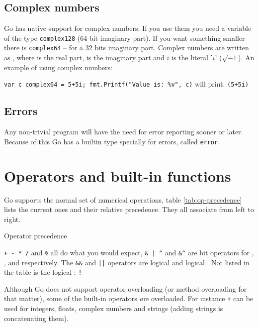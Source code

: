 \subsection{Complex numbers}
Go has native support for complex numbers. If you 
use them you need a variable of the type \lstinline{complex128} (64
bit imaginary part). If you
want something smaller there is \lstinline{complex64} -- for a 32 bits
imaginary part.
Complex numbers are written as
, where  is the real part,
 is the imaginary part and $i$ is the literal '$i$' ($\sqrt{-1}$).
An example of using complex numbers:

\lstinline{var c complex64 = 5+5i; fmt.Printf("Value is: %v", c)}\newline
will print: \lstinline{(5+5i)}

\subsection{Errors}
Any non-trivial program will have the need for error reporting sooner or later. Because of this
Go has a builtin type specially for errors, called \lstinline{error}.

\section{Operators and built-in functions}
Go supports the normal set of numerical operations,
table \ref{tab:op-precedence}
lists the current ones and their relative precedence. They
all associate from left to right.

\begin{table}[H]
\begin{center}
\caption{Operator precedence}
\label{tab:op-precedence}

\end{center}
\end{table}
\verb|+ - * /| and \verb|%| all do what you would expect,
\verb!& | ^!
and \verb!&^! are bit operators for
, 
,  and  respectively.
The \verb|&&| and \verb/||/ operators are 
logical  and
logical . Not listed in the table
is the logical : \verb/!/

Although Go does not support operator overloading (or method
overloading for that matter), some of the built-in
operators \emph{are} overloaded. For instance \texttt{+} can be used for integers,
floats, complex numbers and strings (adding strings is concatenating
them). 

